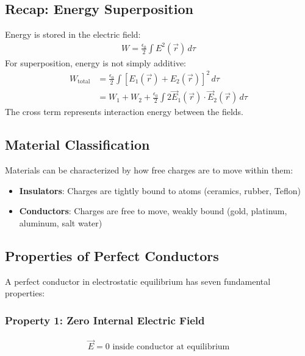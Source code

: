 \documentclass{article}
\begin{document}
\subsection{Recap: Energy Superposition}
\begin{conceptbox}
Energy is stored in the electric field:
\begin{align*}
    W = \frac{\epsilon_0}{2} \int E^2(\vec{r}) \, d\tau
\end{align*}
For superposition, energy is not simply additive:
\begin{align*}
    W_{\text{total}} &= \frac{\epsilon_0}{2} \int [E_1(\vec{r}) + E_2(\vec{r})]^2 \, d\tau \\
    &= W_1 + W_2 + \frac{\epsilon_0}{2}\int 2\vec{E}_1(\vec{r}) \cdot \vec{E}_2(\vec{r}) \, d\tau
\end{align*}
The cross term represents interaction energy between the fields.
\end{conceptbox}

\subsection{Material Classification}
Materials can be characterized by how free charges are to move within them:

\begin{itemize}
    \item \textbf{Insulators}: Charges are tightly bound to atoms (ceramics, rubber, Teflon)
    \item \textbf{Conductors}: Charges are free to move, weakly bound (gold, platinum, aluminum, salt water)
\end{itemize}

\subsection{Properties of Perfect Conductors}
\begin{conceptbox}
A perfect conductor in electrostatic equilibrium has seven fundamental properties:
\end{conceptbox}

\subsubsection{Property 1: Zero Internal Electric Field}
\begin{align*}
    \vec{E} = 0 \text{ inside conductor at equilibrium}
\end{align*}
\end{document}
